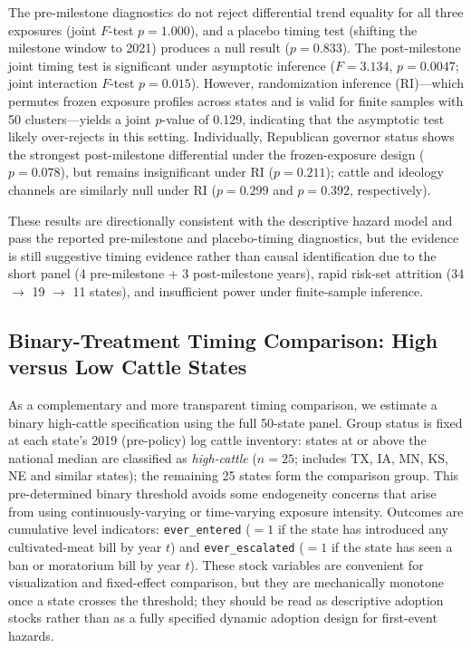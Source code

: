 \documentclass[12pt]{article}
\begin{document}
\begin{appendices}
The pre-milestone diagnostics do not reject differential trend equality for all three exposures (joint $F$-test $p = 1.000$), and a placebo timing test (shifting the milestone window to 2021) produces a null result ($p = 0.833$).  The post-milestone joint timing test is significant under asymptotic inference ($F = 3.134$, $p = 0.0047$; joint interaction $F$-test $p = 0.015$).  However, randomization inference (RI)---which permutes frozen exposure profiles across states and is valid for finite samples with 50 clusters---yields a joint $p$-value of 0.129, indicating that the asymptotic test likely over-rejects in this setting.  Individually, Republican governor status shows the strongest post-milestone differential under the frozen-exposure design ($p = 0.078$), but remains insignificant under RI ($p = 0.211$); cattle and ideology channels are similarly null under RI ($p = 0.299$ and $p = 0.392$, respectively).

These results are directionally consistent with the descriptive hazard model and pass the reported pre-milestone and placebo-timing diagnostics, but the evidence is still suggestive timing evidence rather than causal identification due to the short panel (4 pre-milestone + 3 post-milestone years), rapid risk-set attrition (34 $\to$ 19 $\to$ 11 states), and insufficient power under finite-sample inference.

\subsection{Binary-Treatment Timing Comparison: High versus Low Cattle States}
\label{sec:did_binary}

As a complementary and more transparent timing comparison, we estimate a binary high-cattle specification using the full 50-state panel.  Group status is fixed at each state's 2019 (pre-policy) log cattle inventory: states at or above the national median are classified as \emph{high-cattle} ($n = 25$; includes TX, IA, MN, KS, NE and similar states); the remaining 25 states form the comparison group.  This pre-determined binary threshold avoids some endogeneity concerns that arise from using continuously-varying or time-varying exposure intensity.  Outcomes are cumulative level indicators: \texttt{ever\_entered} ($= 1$ if the state has introduced any cultivated-meat bill by year $t$) and \texttt{ever\_escalated} ($= 1$ if the state has seen a ban or moratorium bill by year $t$).  These stock variables are convenient for visualization and fixed-effect comparison, but they are mechanically monotone once a state crosses the threshold; they should be read as descriptive adoption stocks rather than as a fully specified dynamic adoption design for first-event hazards.


\end{appendices}
\end{document}
